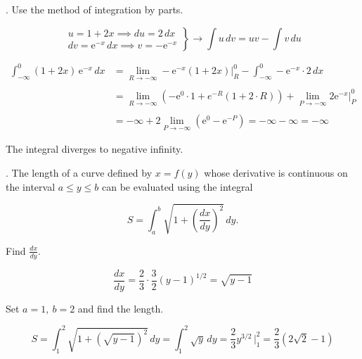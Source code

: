 \documentclass{article}
\begin{document}
\hfill

. Use the method of integration by parts.

\[
\left.\begin{array}{c}
u=1+2x\implies du=2\,dx\\
dv=\mathrm{e}^{-x}\,dx\implies v=-\mathrm{e}^{-x}
\end{array}\right\}\rightarrow\int u\,dv=uv-\int v\,du
\]

\begin{align*}\int_{-\infty}^0(1+2x)\,\mathrm{e}^{-x}\,dx&=\lim_{R\to-\infty}-\mathrm{e}^{-x}(1+2x)\bigg|_R^0-\int_{-\infty}^0-\mathrm{e}^{-x}\cdot2\,dx\\\\&=\lim_{R\to-\infty}\left(-\mathrm{e}^0\cdot1+\mathrm{}e^{-R}(1+2\cdot R)\right)+\lim_{P\to-\infty}2\mathrm{e}^{-x}\bigg|_P^0\\\\&=-\infty+2\lim_{P\to-\infty}\left(\mathrm{e}^0-\mathrm{e}^{-P}\right)=-\infty-\infty=\boxed{-\infty}\end{align*}

\hfill

\noindent The integral diverges to negative infinity.

\hfill

. The length of a curve defined by $x=f(y)$ whose derivative is continuous on the interval $a\leq y\leq b$ can be evaluated using the integral

\[S=\int_a^b\sqrt{1+\left(\frac{dx}{dy}\right)^2}\,dy.\]

\hfill

\noindent Find $\displaystyle\frac{dx}{dy}$.

\[\frac{dx}{dy}=\frac23\cdot\frac32(y-1)^{1/2}=\sqrt{y-1}\]

\hfill

\noindent Set $a=1,\:b=2$ and find the length.

\[S=\int_1^2\sqrt{1+\left(\sqrt{y-1}\right)^2}\,dy=\int_1^2\sqrt{y}\,dy=\frac23y^{3/2}\,\bigg|_1^2=\boxed{\frac23(2\sqrt2-1)}\]
\end{document}
